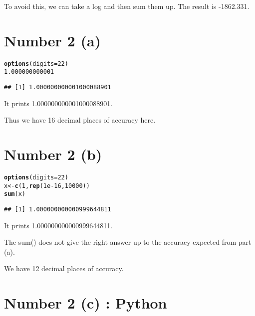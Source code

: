 \documentclass[english]{article}\usepackage[]{graphicx}\usepackage[]{color}
\makeatletter
\newcommand{\hlnum}[1]{\textcolor[rgb]{0.686,0.059,0.569}{#1}}%
\newcommand{\hlstd}[1]{\textcolor[rgb]{0.345,0.345,0.345}{#1}}%
\newcommand{\hlkwb}[1]{\textcolor[rgb]{0.69,0.353,0.396}{#1}}%
\newcommand{\hlkwc}[1]{\textcolor[rgb]{0.333,0.667,0.333}{#1}}%
\newcommand{\hlkwd}[1]{\textcolor[rgb]{0.737,0.353,0.396}{\textbf{#1}}}%
\newenvironment{kframe}{%
 \def\at@end@of@kframe{}%
 \ifinner\ifhmode%
  \def\at@end@of@kframe{\end{minipage}}%
  \begin{minipage}{\columnwidth}%
 \fi\fi%
 \def\FrameCommand##1{\hskip\@totalleftmargin \hskip-\fboxsep
 \colorbox{shadecolor}{##1}\hskip-\fboxsep
     \hskip-\linewidth \hskip-\@totalleftmargin \hskip\columnwidth}%
 \MakeFramed {\advance\hsize-\width
   \@totalleftmargin\z@ \linewidth\hsize
   \@setminipage}}%
 {\par\unskip\endMakeFramed%
 \at@end@of@kframe}
\newenvironment{knitrout}{}{} %
\makeatother
\begin{document}
To avoid this, we can take a log and then sum them up. The result
is -1862.331.


\section*{Number 2 (a)}

\begin{knitrout}
\color{fgcolor}\begin{kframe}
\begin{alltt}
\hlkwd{options}\hlstd{(}\hlkwc{digits}\hlstd{=}\hlnum{22}\hlstd{)}
\hlnum{1.000000000001}
\end{alltt}
\begin{verbatim}
## [1] 1.000000000001000088901
\end{verbatim}
\end{kframe}
\end{knitrout}

It prints 1.000000000001000088901. 

Thus we have 16 decimal places of accuracy here.


\section*{Number 2 (b)}

\begin{knitrout}
\color{fgcolor}\begin{kframe}
\begin{alltt}
\hlkwd{options}\hlstd{(}\hlkwc{digits}\hlstd{=}\hlnum{22}\hlstd{)}
\hlstd{x} \hlkwb{<-} \hlkwd{c}\hlstd{(}\hlnum{1}\hlstd{,} \hlkwd{rep}\hlstd{(}\hlnum{1e-16}\hlstd{,} \hlnum{10000}\hlstd{))}
\hlkwd{sum}\hlstd{(x)}
\end{alltt}
\begin{verbatim}
## [1] 1.000000000000999644811
\end{verbatim}
\end{kframe}
\end{knitrout}

It prints 1.000000000000999644811.

The sum() does not give the right answer up to the accuracy expected
from part (a).

We have 12 decimal places of accuracy.


\section*{Number 2 (c) : Python}
\end{document}
